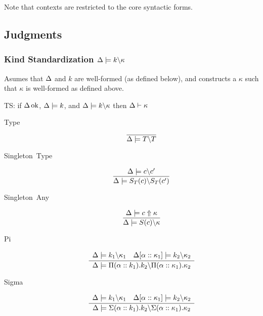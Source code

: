 \documentclass[12pt,twoside,fleqn]{amsart}
\theoremstyle{plain}
\theoremstyle{plain}
\theoremstyle{definition}
\begin{document}
Note that contexts are restricted to the core syntactic forms.


\subsection{Judgments}


\newcommand{\kstandard}[3]{#1 \models #2 \backslash #3 }

\newcommand{\cstandard}[3]{#1 \models #2 \backslash #3 }

\newcommand{\tstandard}[3]{#1 \models #2 \backslash #3 }
 
\newcommand{\estandard}[3]{#1 \models #2 \backslash #3 }



\subsubsection{Kind Standardization \protect\( \kstandard{\context }{k}{\kappa }\protect \)}

Asumes that \( \Delta  \) and \( k \) are well-formed (as defined below),
and constructs a \( \kappa  \) such that \( \kappa  \) is well-formed as defined
above.

TS: if \( \Delta  \, \mathrm{ok} \), \( \Delta  \models k \), and \( \kstandard{\context }{k}{\kappa } \)
then \( \Delta  \vdash \kappa  \)

\begin{description}
\item [Type]
\[
\axiom{\kstandard{\context }{T}{T}}\]

\item [Singleton~Type]
\[
\infrule{\cstandard{\context }{c}{c'}}{\kstandard{\context }{\st{c}}{\st{c'}}}\]

\item [Singleton~Any]
\[
\infrule{\kindsynth{\context }{c}{\kappa }}{\kstandard{\context }{S(c)}{\kappa }}\]

\item [Pi]
\[
\infrule{\begin{array}{ll}
\kstandard{\context }{k_{1}}{\kappa _{1}} & \kstandard{\caddk{\alpha }{\kappa _{1}}}{k_{2}}{\kappa _{2}}
\end{array}}{\kstandard{\context }{\Pi (\alpha ::k_{1}).k_{2}}{\Pi (\alpha ::\kappa _{1}).\kappa _{2}}}\]

\item [Sigma]
\[
\infrule{\begin{array}{ll}
\kstandard{\context }{k_{1}}{\kappa _{1}} & \kstandard{\caddk{\alpha }{\kappa _{1}}}{k_{2}}{\kappa _{2}}
\end{array}}{\kstandard{\context }{\Sigma (\alpha ::k_{1}).k_{2}}{\Sigma (\alpha ::\kappa _{1}).\kappa _{2}}}\]

\end{description}
\end{document}
